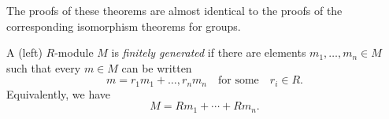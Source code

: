 The proofs of these theorems are almost identical to the proofs of the corresponding isomorphism theorems for groups.

\begin{dfn}
  A (left) $R$-module $M$ is \emph{finitely generated} if there are elements $m_1, \ldots, m_n \in M$ such that every $m \in M$ can be written
  \[
  m = r_1 m_1 + \ldots, r_n m_n \quad \text{for some} \quad r_i \in R. 
  \]
  Equivalently, we have
  \[
  M = Rm_1 + \cdots + Rm_n.
  \]
\end{dfn}


